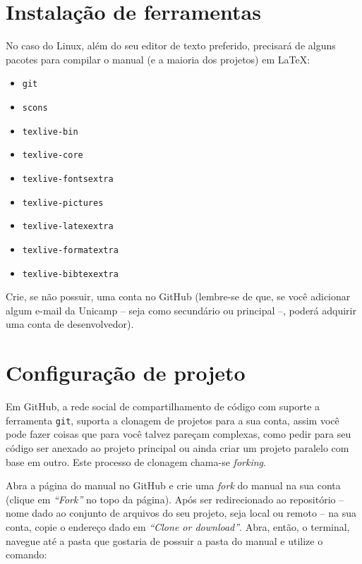 \documentclass[a4paper,oneside,10pt]{memoir}
\begin{document}
\section{Instalação de ferramentas}

No caso do Linux, além do seu editor de texto preferido, precisará de alguns
pacotes para compilar o manual (e a maioria dos projetos) em \LaTeX:

\begin{multicols}{2}
\begin{itemize}[noitemsep] %
\item \texttt{git}
\item \texttt{scons}
\item \texttt{texlive-bin}
\item \texttt{texlive-core}
\item \texttt{texlive-fontsextra}
\item \texttt{texlive-pictures}
\item \texttt{texlive-latexextra}
\item \texttt{texlive-formatextra}
\item \texttt{texlive-bibtexextra}
\end{itemize}
\end{multicols}

Crie, se não possuir, uma conta no GitHub (lembre-se de que, se você adicionar
algum e-mail da Unicamp -- seja como secundário ou principal --, poderá
adquirir uma conta de desenvolvedor).

\section{Configuração de projeto}

Em GitHub, a rede social de compartilhamento de código com suporte a ferramenta
\texttt{git}, suporta a clonagem de projetos para a sua conta, assim você pode
fazer coisas que para você talvez pareçam complexas, como pedir para seu código
ser anexado ao projeto principal ou ainda criar um projeto paralelo com base em
outro. Este processo de clonagem chama-se \emph{forking}.

Abra a página do manual no GitHub e crie uma \emph{fork} do manual na sua conta
(clique em \emph{“Fork”} no topo da página). Após ser redirecionado ao
repositório -- nome dado ao conjunto de arquivos do seu projeto, seja local
ou remoto -- na sua conta, copie o endereço dado em \emph{“Clone or download”}.
Abra, então, o terminal, navegue até a pasta que gostaria de possuir a pasta do
manual e utilize o comando:
\end{document}

